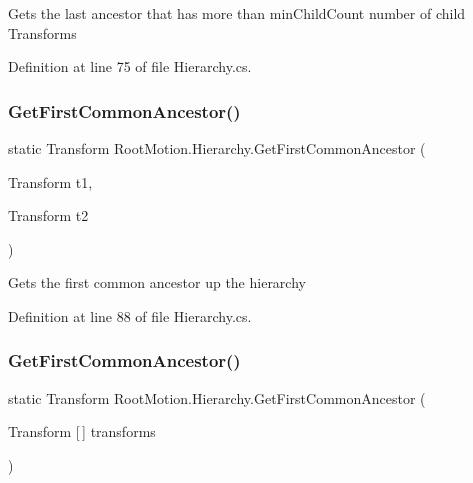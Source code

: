 Gets the last ancestor that has more than min\+Child\+Count number of child Transforms 



Definition at line 75 of file Hierarchy.\+cs.

\mbox{\label{class_root_motion_1_1_hierarchy_aa929c256d633e081ba43e7cae79dde38}} 
\subsubsection{\texorpdfstring{Get\+First\+Common\+Ancestor()}{GetFirstCommonAncestor()}\hspace{0.1cm}{\footnotesize\ttfamily [1/2]}}
{\footnotesize\ttfamily static Transform Root\+Motion.\+Hierarchy.\+Get\+First\+Common\+Ancestor (\begin{DoxyParamCaption}\item[{Transform}]{t1,  }\item[{Transform}]{t2 }\end{DoxyParamCaption})\hspace{0.3cm}{\ttfamily [static]}}



Gets the first common ancestor up the hierarchy 



Definition at line 88 of file Hierarchy.\+cs.

\mbox{\label{class_root_motion_1_1_hierarchy_a31df37f173becc59e1fc080d52aa412e}} 
\subsubsection{\texorpdfstring{Get\+First\+Common\+Ancestor()}{GetFirstCommonAncestor()}\hspace{0.1cm}{\footnotesize\ttfamily [2/2]}}
{\footnotesize\ttfamily static Transform Root\+Motion.\+Hierarchy.\+Get\+First\+Common\+Ancestor (\begin{DoxyParamCaption}\item[{Transform \mbox{[}$\,$\mbox{]}}]{transforms }\end{DoxyParamCaption})\hspace{0.3cm}{\ttfamily [static]}}



